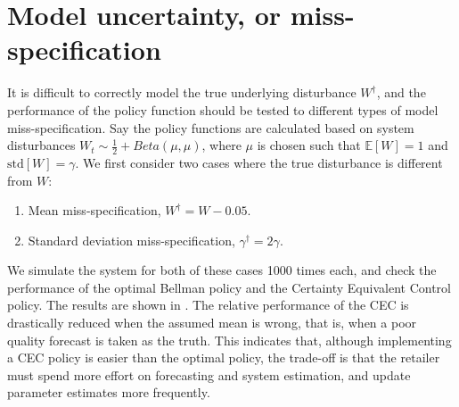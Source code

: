 \documentclass[main.tex]{subfiles}
\begin{document}



\listoftodos

\section{Model uncertainty, or
  miss-specification}\label{sec:markdown_miss_specification}
It is difficult to correctly model the true underlying disturbance
$W^\dagger$, and the performance of the policy function should be
tested to different types of model miss-specification.
Say the policy functions are calculated based on
system disturbances $W_t\sim \frac{1}{2}+Beta(\mu,\mu)$, where
$\mu$ is chosen such that $\mathbb E[W]=1$ and $\mbox{std}[W]=\gamma$.
We first consider two cases where the true disturbance is
different from $W$:
\begin{enumerate}
\item Mean miss-specification, $W^\dagger = W-0.05$.
\item Standard deviation miss-specification, $\gamma^\dagger = 2\gamma$.
\end{enumerate}
We simulate the system for both of these cases 1000 times each,
and check the performance of the optimal Bellman policy and the
Certainty Equivalent Control policy. The results are shown in
.
The relative performance of the CEC is drastically reduced when the
assumed mean is wrong, that is, when a poor quality forecast is taken as
the truth. This indicates that, although implementing a CEC policy is
easier than the optimal policy, the trade-off is that the retailer
must spend more effort on forecasting and system estimation, and
update parameter estimates more frequently.
\end{document}
